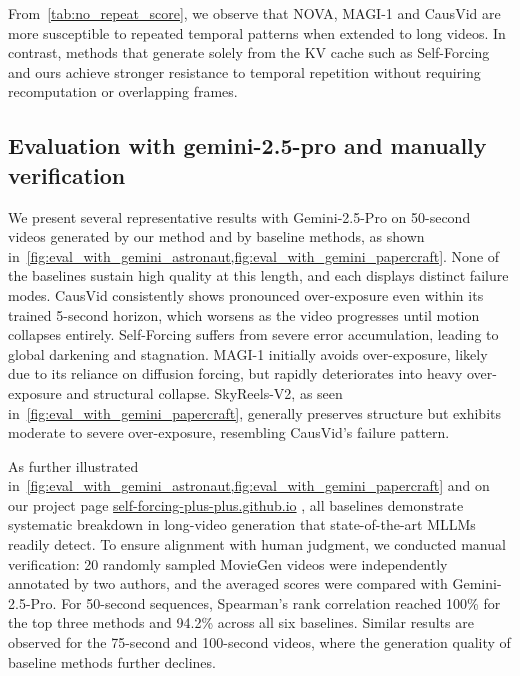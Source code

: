 From~\cref{tab:no_repeat_score}, we observe that NOVA, MAGI-1 and CausVid are more susceptible to repeated temporal patterns when extended to long videos. In contrast, methods that generate solely from the KV cache such as Self-Forcing and ours achieve stronger resistance to temporal repetition without requiring recomputation or overlapping frames.




\subsection{Evaluation with gemini-2.5-pro and manually verification}
\label{appendix.sec.gemini}
We present several representative results with Gemini-2.5-Pro on 50-second videos generated by our method and by baseline methods, as shown in~\cref{fig:eval_with_gemini_astronaut,fig:eval_with_gemini_papercraft}. None of the baselines sustain high quality at this length, and each displays distinct failure modes. CausVid consistently shows pronounced over-exposure even within its trained 5-second horizon, which worsens as the video progresses until motion collapses entirely. Self-Forcing suffers from severe error accumulation, leading to global darkening and stagnation. MAGI-1 initially avoids over-exposure, likely due to its reliance on diffusion forcing, but rapidly deteriorates into heavy over-exposure and structural collapse. SkyReels-V2, as seen in~\cref{fig:eval_with_gemini_papercraft}, generally preserves structure but exhibits moderate to severe over-exposure, resembling CausVid’s failure pattern.

As further illustrated in~\cref{fig:eval_with_gemini_astronaut,fig:eval_with_gemini_papercraft} and on our project page \href{https://self-forcing-plus-plus.github.io/}{self-forcing-plus-plus.github.io}
, all baselines demonstrate systematic breakdown in long-video generation that state-of-the-art MLLMs readily detect. To ensure alignment with human judgment, we conducted manual verification: 20 randomly sampled MovieGen videos were independently annotated by two authors, and the averaged scores were compared with Gemini-2.5-Pro. For 50-second sequences, Spearman’s rank correlation reached 100\% for the top three methods and 94.2\% across all six baselines. Similar results are observed for the 75-second and 100-second videos, where the generation quality of baseline methods further declines.


